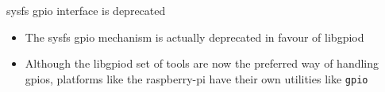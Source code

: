 \begin{frame}
   {sysfs gpio interface is deprecated}
   \begin{itemize}
      \item The sysfs gpio mechanism is actually deprecated in favour of libgpiod
      \item Although the libgpiod set of tools are now the preferred way of handling
	      gpios, platforms like the raspberry-pi have their own utilities
	      like \verb?gpio?
   \end{itemize}
\end{frame}

\cprotect{}


